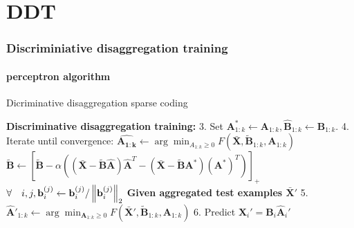 \documentclass[gray]{beamer}
\begin{document}
\section{DDT}
\begin{frame}
\frametitle{Discriminiative disaggregation training}
\framesubtitle{perceptron algorithm}
\begin{algorithm}[H]
\caption{Dicriminative disaggregation sparse coding}
\label{alg:DDSC}
\begin{algorithmic}[1]
\Statex \textbf{Discriminative disaggregation training:}
\Statex  \hspace{0.2in} 3. Set $\mathbf{A}_{1:k}^* \leftarrow \mathbf{A}_{1:k},\hat{\mathbf{B}}_{1:k} \leftarrow \mathbf{B}_{1:k}.$
\Statex  \hspace{0.2in} 4. Iterate until convergence:
\Statex \hspace{0.4in} $\hat{\mathbf{A_{1:k}}} \leftarrow \arg \! \min_{A_{1:k} \geq 0} F\left( \bar{\mathbf{X}},\tilde{\mathbf{B}}_{1:k},\mathbf{A}_{1:k} \right)$
\Statex \hspace{0.4in} $\tilde{\mathbf{B}} \leftarrow \left[ \tilde{\mathbf{B}} - \alpha \left( (\bar{\mathbf{X}} - \tilde{\mathbf{B}}\hat{\mathbf{A}})\hat{\mathbf{A}}^T - (\bar{\mathbf{X}}-\tilde{\mathbf{B}}\mathbf{A}^*)(\mathbf{A}^*)^T \right) \right]_+$
\Statex \hspace{0.4in} $\forall \quad i,j,\mathbf{b}_i^{(j)} \leftarrow \mathbf{b}_i^{(j)} / \left\lVert\mathbf{b}_i^{(j)}\right\rVert_2$
\Statex \textbf{Given aggregated test examples $\bar{\mathbf{X}}'$}
\Statex \hspace{0.2in} 5. $\hat{\mathbf{A}}'_{1:k} \leftarrow \arg \! \min_{\mathbf{A}_{1:k} \geq 0} F(\bar{\mathbf{X}}',\tilde{\mathbf{B}}_{1:k},\mathbf{A}_{1:k})$
\Statex \hspace{0.2in} 6. Predict $\hat{\mathbf{X}}_i' = \mathbf{B}_i\hat{\mathbf{A}}_i'$
\end{algorithmic}
\end{algorithm}
\end{frame}



\end{document}
